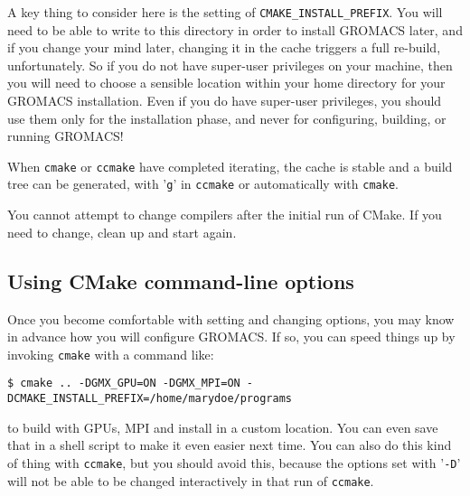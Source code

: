 \documentclass{article}[12pt,a4paper,twoside]
\newcommand{\gromacs}{GROMACS}
\newcommand{\cmake}{CMake}
\begin{document}
A key thing to consider here is the setting of
\verb+CMAKE_INSTALL_PREFIX+. You will need to be able to write to this
directory in order to install \gromacs{} later, and if you change your
mind later, changing it in the cache triggers a full re-build,
unfortunately. So if you do not have super-user privileges on your
machine, then you will need to choose a sensible location within your
home directory for your \gromacs{} installation. Even if you do have
super-user privileges, you should use them only for the installation
phase, and never for configuring, building, or running \gromacs{}!

When \verb+cmake+ or \verb+ccmake+ have completed iterating, the
cache is stable and a build tree can be generated, with '\verb+g+' in
\verb+ccmake+ or automatically with \verb+cmake+.

You cannot attempt to change compilers after the initial run of
\cmake{}. If you need to change, clean up and start again.

\subsection{Using CMake command-line options}
Once you become comfortable with setting and changing options, you
may know in advance how you will configure \gromacs{}. If so, you can
speed things up by invoking \verb+cmake+ with a command like:
\begin{verbatim}
$ cmake .. -DGMX_GPU=ON -DGMX_MPI=ON -DCMAKE_INSTALL_PREFIX=/home/marydoe/programs
\end{verbatim}
to build with GPUs, MPI and install in a custom location. You can even
save that in a shell script to make it even easier next time. You can
also do this kind of thing with \verb+ccmake+, but you should avoid
this, because the options set with '\verb+-D+' will not be able to be
changed interactively in that run of \verb+ccmake+.
\end{document}

